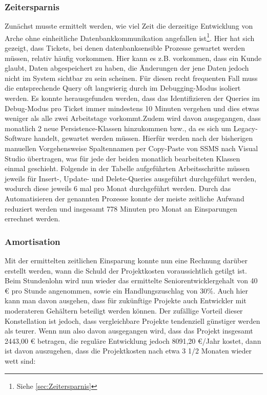 \documentclass[11pt,toc=sectionentrywithoutdots, 
headheight=44pt, headings=optiontoheadandtoc, hyperfootnotes=false, hypertexnames=false]{scrartcl}
\newcommand\extendedref[1]{Siehe \ref{#1}}
\begin{document}
\subsubsection{Zeitersparnis}
Zunächst musste ermittelt werden, wie viel Zeit die derzeitige Entwicklung von Arche ohne einheitliche Datenbankkommunikation angefallen ist\footnote{\extendedref{sec:Zeitersparnis}}. Hier hat sich gezeigt, dass Tickets, bei denen datenbanksensible Prozesse gewartet werden müssen, relativ häufig vorkommen. Hier kann es z.B. vorkommen, dass ein Kunde glaubt, Daten abgespeichert zu haben, die Änderungen der jene Daten jedoch nicht im System sichtbar zu sein scheinen. Für diesen recht frequenten Fall muss die entsprechende Query oft langwierig durch im Debugging-Modus isoliert werden. Es konnte herausgefunden werden, dass das Identifizieren der Queries im Debug-Modus pro Ticket immer mindestens 10 Minuten vergehen und dies etwas weniger als alle zwei Arbeitstage vorkommt.\newline\newline Zudem wird davon ausgegangen, dass monatlich 2 neue Persistence-Klassen hinzukommen bzw., da es sich um Legacy-Software handelt, gewartet werden müssen. Hierfür werden nach der bisherigen manuellen Vorgehensweise Spaltennamen per Copy-Paste von SSMS nach Visual Studio übertragen, was für jede der beiden monatlich bearbeiteten Klassen einmal geschieht. Folgende in der Tabelle aufgeführten Arbeitsschritte müssen jeweils für Insert-, Update- und Delete-Queries ausgeführt durchgeführt werden, wodurch diese jeweils 6 mal pro Monat durchgeführt werden. Durch das Automatisieren der genannten Prozesse konnte der meiste zeitliche Aufwand reduziert werden und insgesamt 778 Minuten pro Monat an Einsparungen errechnet werden.

\subsubsection{Amortisation}
Mit der ermittelten zeitlichen Einsparung konnte nun eine Rechnung darüber erstellt werden, wann die Schuld der Projektkosten voraussichtlich getilgt ist. Beim Stundenlohn wird nun wieder das ermittelte Seniorentwicklergehalt von 40 € pro Stunde angenommen, sowie ein Handlungszuschlag von 30\%. Auch hier kann man davon ausgehen, dass für zukünftige Projekte auch Entwickler mit moderateren Gehältern beteiligt werden können. Der zufällige Vorteil dieser Konstellation ist jedoch, dass vergleichbare Projekte tendenziell günstiger werden als teurer. Wenn nun also davon ausgegangen wird, dass das Projekt insgesamt 2443,00 € betragen, die reguläre Entwicklung jedoch 8091,20 €/Jahr kostet, dann ist davon auszugehen, dass die Projektkosten nach etwa 3 1/2 Monaten wieder wett sind:%
\end{document}

